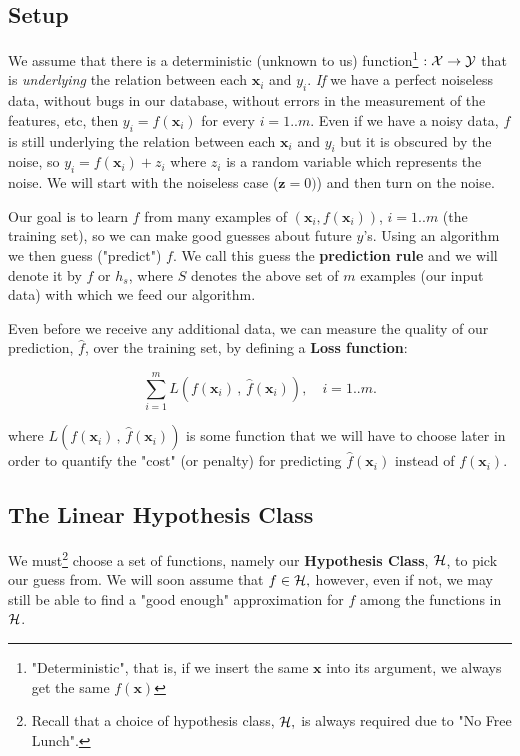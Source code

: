 \subsection{Setup}
We assume that there is a deterministic (unknown to us) function\footnote{"Deterministic", that is, if we insert the same $\mathbf{x}$ into its argument, we always get the same $f(\mathbf{x})$}
$:\mathcal{X}\to\mathcal{Y}$ that is \textit{underlying} the relation between each $\mathbf{x}_i$ and $y_i$. \textit{If} we have a perfect noiseless data, without  bugs in our database, without errors in the measurement of the features, etc,  then  $y_i=f(\mathbf{x}_i)$ for every $i=1..m$. Even if we have a noisy data, $f$ is still underlying the relation between each $\mathbf{x}_i$ and $y_i$ but it is obscured by the noise, so $y_i=f(\mathbf{x}_i)+z_i$ where $z_i$ is a random variable which represents the noise. We will start with the noiseless case ($\mathbf{z}=0)$) and then turn on the noise.


Our goal is to learn $f$ from many examples of $(\mathbf{x}_i,f(\mathbf{x}_i))$, $i=1..m$  (the training set), so we can make good guesses about future $y$'s.
Using an algorithm we then guess ("predict") $f$. We call this guess the \textbf{prediction rule} and we will denote it by  $\hat{f}$ or $h_s$,   where $S$ denotes the above set of $m$ examples (our input data) with which we feed our algorithm.

Even before we receive any additional data, we can measure the quality of our prediction, $\hat{f}$, over the training set, by defining  a \textbf{Loss function}:

  \[
 \sum_{i=1}^m L(f(\mathbf{x}_i)\,,\,\hat{f}(\mathbf{x}_i)),\quad i=1..m.
  \]

where  $L(f(\mathbf{x}_i)\,,\,\hat{f}(\mathbf{x}_i))$  is some function that we will have to choose later in order to quantify the "cost" (or penalty) for predicting $\hat{f}(\mathbf{x}_i)$ instead of $f(\mathbf{x}_i)$.


\subsection{The Linear Hypothesis Class}

 We must\footnote{Recall that a choice of hypothesis class, $\mathcal{H},$ is always required due to "No Free Lunch".}
 choose a set of functions, namely our \textbf{Hypothesis Class}, $\mathcal{H}$, to pick our guess from. We will soon assume that $f\in\mathcal{H},$ however, even if not, we may still be able to find a "good enough" approximation for $f$ among the functions in $\mathcal{H}$.

